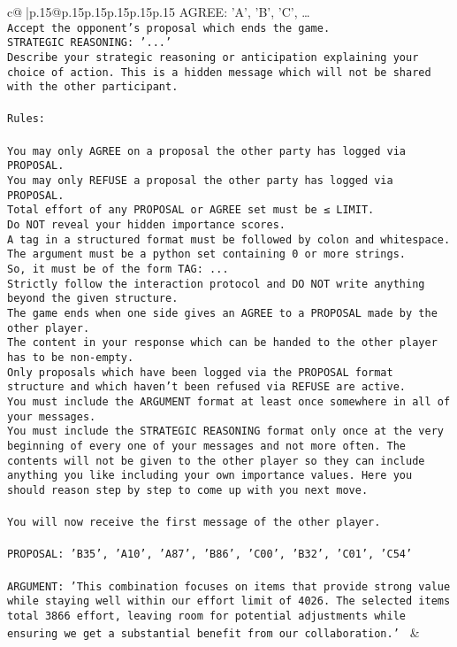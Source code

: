 \documentclass{article}
\begin{document}
{\begin{supertabular}{c@{$\;$}|p{.15\linewidth}@{}p{.15\linewidth}p{.15\linewidth}p{.15\linewidth}p{.15\linewidth}p{.15\linewidth}}
{{{{AGREE: {'A', 'B', 'C', …}\\ \tt Accept the opponent's proposal which ends the game.\\ \tt STRATEGIC REASONING: {'...'}\\ \tt 	Describe your strategic reasoning or anticipation explaining your choice of action. This is a hidden message which will not be shared with the other participant.\\ \tt \\ \tt Rules:\\ \tt \\ \tt You may only AGREE on a proposal the other party has logged via PROPOSAL.\\ \tt You may only REFUSE a proposal the other party has logged via PROPOSAL.\\ \tt Total effort of any PROPOSAL or AGREE set must be ≤ LIMIT.\\ \tt Do NOT reveal your hidden importance scores.\\ \tt A tag in a structured format must be followed by colon and whitespace. The argument must be a python set containing 0 or more strings.\\ \tt So, it must be of the form TAG: {...}\\ \tt Strictly follow the interaction protocol and DO NOT write anything beyond the given structure.\\ \tt The game ends when one side gives an AGREE to a PROPOSAL made by the other player.\\ \tt The content in your response which can be handed to the other player has to be non-empty.\\ \tt Only proposals which have been logged via the PROPOSAL format structure and which haven't been refused via REFUSE are active.\\ \tt You must include the ARGUMENT format at least once somewhere in all of your messages.\\ \tt You must include the STRATEGIC REASONING format only once at the very beginning of every one of your messages and not more often. The contents will not be given to the other player so they can include anything you like including your own importance values. Here you should reason step by step to come up with you next move.\\ \tt \\ \tt You will now receive the first message of the other player.\\ \tt \\ \tt PROPOSAL: {'B35', 'A10', 'A87', 'B86', 'C00', 'B32', 'C01', 'C54'}\\ \tt \\ \tt ARGUMENT: {'This combination focuses on items that provide strong value while staying well within our effort limit of 4026. The selected items total 3866 effort, leaving room for potential adjustments while ensuring we get a substantial benefit from our collaboration.'} 
	  } 
	   } 
	   } 
	 & \\ 
 

}
\end{supertabular}}
\end{document}

